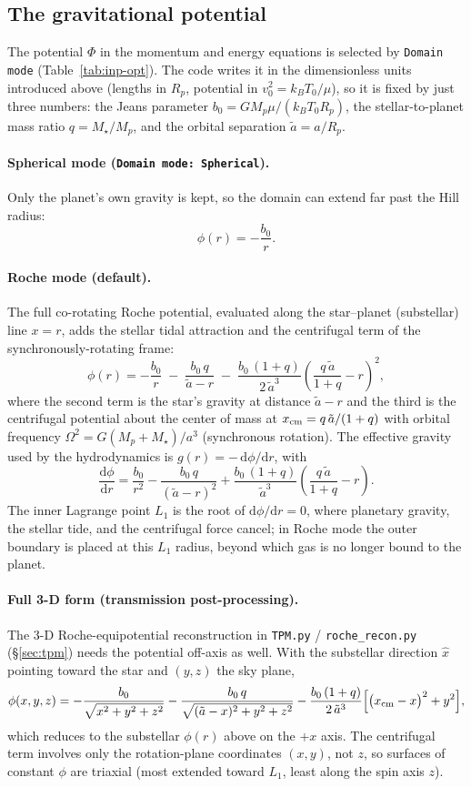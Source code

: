\documentclass[english,a4paper]{kiseon_memo}
\begin{document}
\subsection{The gravitational potential}\label{sec:potential}
The potential $\Phi$ in the momentum and energy equations is selected by
\texttt{Domain mode} (Table~\ref{tab:inp-opt}). The code writes it in the
dimensionless units introduced above (lengths in $R_p$, potential in
$v_0^2=k_BT_0/\mu$), so it is fixed by just three numbers: the Jeans parameter
$b_0=GM_p\mu/(k_BT_0R_p)$, the stellar-to-planet mass ratio $q=M_\star/M_p$, and
the orbital separation $\tilde a=a/R_p$.

\paragraph{Spherical mode (\texttt{Domain mode: Spherical}).}
Only the planet's own gravity is kept, so the domain can extend far past the Hill
radius:
\[
\phi(r) = -\frac{b_0}{r}.
\]

\paragraph{Roche mode (default).}
The full co-rotating Roche potential, evaluated along the star--planet
(substellar) line $x=r$, adds the stellar tidal attraction and the centrifugal
term of the synchronously-rotating frame:
\[
\phi(r) = -\frac{b_0}{r}
          \;-\;\frac{b_0\,q}{\tilde a - r}
          \;-\;\frac{b_0\,(1+q)}{2\,\tilde a^{3}}
                \left(\frac{q\,\tilde a}{1+q} - r\right)^{2},
\]
where the second term is the star's gravity at distance $\tilde a-r$ and the
third is the centrifugal potential about the center of mass at
$x_{\rm cm}=q\,\tilde a/(1+q)$ with orbital frequency $\Omega^2=G(M_p+M_\star)/a^3$
(synchronous rotation). The effective gravity used by the hydrodynamics is
$g(r)=-\,\mathrm d\phi/\mathrm dr$, with
\[
\frac{\mathrm d\phi}{\mathrm dr} = \frac{b_0}{r^2}
   - \frac{b_0\,q}{(\tilde a-r)^2}
   + \frac{b_0\,(1+q)}{\tilde a^{3}}\left(\frac{q\,\tilde a}{1+q}-r\right).
\]
The inner Lagrange point $L_1$ is the root of $\mathrm d\phi/\mathrm dr=0$, where
planetary gravity, the stellar tide, and the centrifugal force cancel; in Roche
mode the outer boundary is placed at this $L_1$ radius, beyond which gas is no
longer bound to the planet.

\paragraph{Full 3-D form (transmission post-processing).}
The 3-D Roche-equipotential reconstruction in \texttt{TPM.py} /
\texttt{roche\_recon.py} (\S\ref{sec:tpm}) needs the potential off-axis as well.
With the substellar direction $\hat x$ pointing toward the star and $(y,z)$ the
sky plane,
\[
\phi(x,y,z) = -\frac{b_0}{\sqrt{x^2+y^2+z^2}}
   - \frac{b_0\,q}{\sqrt{(\tilde a-x)^2+y^2+z^2}}
   - \frac{b_0\,(1+q)}{2\,\tilde a^{3}}
        \Big[\big(x_{\rm cm}-x\big)^2 + y^2\Big],
\]
which reduces to the substellar $\phi(r)$ above on the $+x$ axis. The centrifugal
term involves only the rotation-plane coordinates $(x,y)$, not $z$, so surfaces of
constant $\phi$ are triaxial (most extended toward $L_1$, least along the spin
axis $z$).
\end{document}
